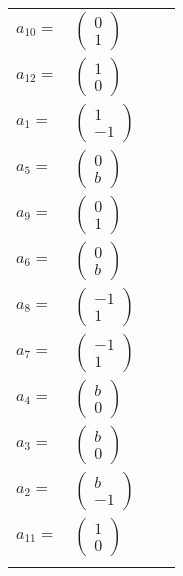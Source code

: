 \documentclass[1p]{elsarticle_modified}
\theoremstyle{definition}
\begin{document}
\begin{tabular}{m{7pt} m{180pt} m{7pt} m{180pt} }
\flushright $a_{10}=$&$\begin{pmatrix}0\\1\end{pmatrix}$ \\
\flushright $a_{12}=$&$\begin{pmatrix}1\\0\end{pmatrix}$ \\
\flushright $a_{1}=$&$\begin{pmatrix}1\\-1\end{pmatrix}$ \\
\flushright $a_{5}=$&$\begin{pmatrix}0\\b\end{pmatrix}$ \\
\flushright $a_{9}=$&$\begin{pmatrix}0\\1\end{pmatrix}$ \\
\flushright $a_{6}=$&$\begin{pmatrix}0\\b\end{pmatrix}$ \\
\flushright $a_{8}=$&$\begin{pmatrix}-1\\1\end{pmatrix}$ \\
\flushright $a_{7}=$&$\begin{pmatrix}-1\\1\end{pmatrix}$ \\
\flushright $a_{4}=$&$\begin{pmatrix}b\\0\end{pmatrix}$ \\
\flushright $a_{3}=$&$\begin{pmatrix}b\\0\end{pmatrix}$ \\
\flushright $a_{2}=$&$\begin{pmatrix}b\\-1\end{pmatrix}$ \\
\flushright $a_{11}=$&$\begin{pmatrix}1\\0\end{pmatrix}$\\&\end{tabular}
\end{document}
